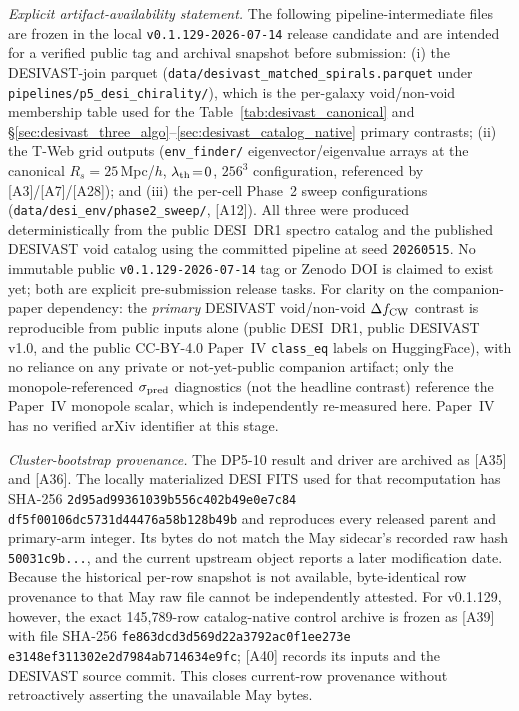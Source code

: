 \documentclass[aps,prd,twocolumn,superscriptaddress,showpacs,preprintnumbers,nofootinbib,longbibliography,floatfix]{revtex4-2}
\newcommand{\paperVersion}{v0.1.129-2026-07-14}
\begin{document}
\emph{Explicit artifact-availability statement.}
The following pipeline-intermediate files are frozen in the local
\texttt{\paperVersion} release candidate and are intended for a verified
public tag and archival snapshot before submission:
(i) the DESIVAST-join parquet
(\texttt{data/desivast\_matched\_spirals.parquet} under
\texttt{pipelines/p5\_desi\_chirality/}),
which is the per-galaxy void/non-void membership table used for the
Table~\ref{tab:desivast_canonical} and
\S\ref{sec:desivast_three_algo}--\ref{sec:desivast_catalog_native}
primary contrasts;
(ii) the T-Web grid outputs
(\texttt{env\_finder/} eigenvector/eigenvalue arrays at the
canonical $R_s\!=\!25$\,Mpc/$h$, $\lambda_{\rm th}\!=\!0$, $256^3$
configuration, referenced by [A3]/[A7]/[A28]);
and (iii) the per-cell Phase~2 sweep configurations
(\texttt{data/desi\_env/phase2\_sweep/}, [A12]).
All three were produced deterministically from the public DESI~DR1
spectro catalog and the published DESIVAST void catalog using the
committed pipeline at seed \texttt{20260515}.
No immutable public \texttt{\paperVersion} tag or Zenodo DOI is claimed to
exist yet; both are explicit pre-submission release tasks. For clarity on the
companion-paper dependency: the \emph{primary} DESIVAST void/non-void
$\Delta f_{\rm CW}$ contrast is reproducible from public inputs alone
(public DESI~DR1, public DESIVAST v1.0, and the public CC-BY-4.0 Paper~IV
\texttt{class\_eq} labels on HuggingFace), with no reliance on any private
or not-yet-public companion artifact; only the monopole-referenced
$\sigma_{\rm pred}$ diagnostics (not the headline contrast) reference the
Paper~IV monopole scalar, which is independently re-measured here.
Paper~IV has no verified arXiv identifier at this stage.

\emph{Cluster-bootstrap provenance.} The DP5-10 result and driver are
archived as [A35] and [A36]. The locally materialized DESI FITS used for
that recomputation has SHA-256
\texttt{2d95ad99361039b5}\allowbreak\texttt{56c402b49e0e7c84}\allowbreak
\texttt{df5f00106dc5731d}\allowbreak\texttt{44476a58b128b49b}
and reproduces every released parent and primary-arm integer. Its bytes
do not match the May sidecar's recorded raw hash
\texttt{50031c9b...}, and the current upstream object reports a later
modification date. Because the historical per-row snapshot is not
available, byte-identical row provenance to that May raw file cannot be
independently attested. For v0.1.129, however, the exact 145,789-row
catalog-native control archive is frozen as [A39] with file SHA-256
\texttt{fe863dcd3d569d22a3792ac0f1ee273e}
\texttt{e3148ef311302e2d7984ab714634e9fc}; [A40] records its inputs and the
DESIVAST source commit. This closes current-row provenance without
retroactively asserting the unavailable May bytes.
\end{document}
